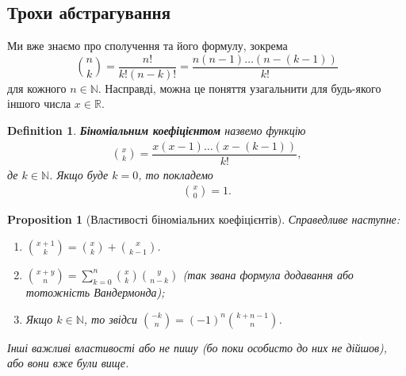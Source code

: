 \documentclass[a4paper, 14pt]{extarticle}
\theoremstyle{theoremdd}
\theoremstyle{theoremdd}
\newtheorem{definition}[theorem]{Definition}
\theoremstyle{theoremdd}
\theoremstyle{theoremdd}
\theoremstyle{theoremdd}
\theoremstyle{theoremdd}
\theoremstyle{theoremdd}
\theoremstyle{theoremdd}
\theoremstyle{theoremdd}
\newtheorem{proposition}[theorem]{Proposition}
\theoremstyle{theoremdd}
\theoremstyle{theoremdd}
\theoremstyle{theoremdd}
\theoremstyle{theoremdd}
\theoremstyle{theoremdd}
\theoremstyle{theoremdd}
\begin{document}
\subsection{Трохи абстрагування}
Ми вже знаємо про сполучення та його формулу, зокрема
\[
{n \choose k} = \dfrac{n!}{k! (n-k)!} = \dfrac{n (n-1) \dots (n-(k-1))}{k!}
\]
для кожного $n \in \mathbb{N}$. Насправді, можна це поняття узагальнити для будь-якого іншого числа $x \in \mathbb{R}$.

\begin{definition}
\textbf{Біноміальним коефіцієнтом} назвемо функцію
\begin{align*}
{x \choose k} = \dfrac{x(x-1) \dots (x-(k-1))}{k!},
\end{align*}
де $k \in \mathbb{N}$. Якщо буде $k = 0$, то покладемо
\begin{align*}
{x \choose 0} = 1.
\end{align*}
\end{definition}

\begin{proposition}[Властивості біноміальних коефіцієнтів]
Справедливе наступне:
\begin{enumerate}[nosep,wide=0pt,label={\arabic*)}]
\item $\displaystyle {x+1 \choose k} = {x \choose k} + {x \choose k-1}$.
\item $\displaystyle {x+y \choose n} = \sum_{k=0}^n {x \choose k} {y \choose n-k}$ (так звана формула додавання або тотожність Вандермонда);
\item Якщо $k \in \mathbb{N}$, то звідси $\displaystyle {-k \choose n} = (-1)^n {k+n-1 \choose n}$.
\end{enumerate}
Інші важливі властивості або не пишу (бо поки особисто до них не дійшов), або вони вже були вище.
\end{proposition}
\end{document}
